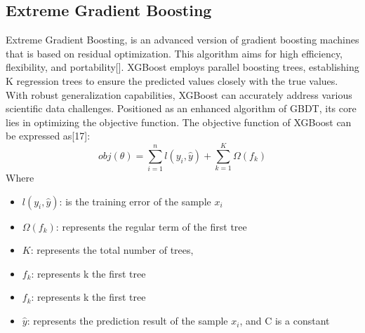 \documentclass{ieeeojies}
\begin{document}
\subsection{Extreme Gradient Boosting}
Extreme Gradient Boosting, is an advanced version of gradient boosting machines that is based on residual optimization. This algorithm aims for high efficiency, flexibility, and portability[]. XGBoost employs parallel boosting trees, establishing K regression trees to ensure the predicted values closely with the true values. With robust generalization capabilities, XGBoost can accurately address various scientific data challenges. Positioned as an enhanced algorithm of GBDT, its core lies in optimizing the objective function. The objective function of XGBoost can be expressed as[17]:
\[{obj}(\theta) = \sum_{i=1}^{n} l(y_i, \hat{y}) + \sum_{k=1}^{K} \Omega(f_k)\]
Where
\begin{itemize}
 \item \( l(y_i, \hat{y}) \): is the training error of the sample \(x_i\)
 \item \( \Omega(f_k) \):  represents the regular term of the first tree
 \item \(K\): represents the total number of trees, 
 \item \(f_k\): represents k the first tree
 \item \(f_k\): represents k the first tree
 \item \(\hat{y}\): represents the prediction result of the sample \(x_i\), and C is a constant


\end{itemize}
\end{document}
